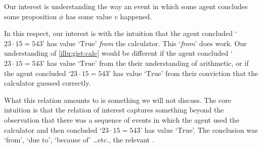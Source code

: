 \begin{note}
  Our interest is understanding the way an event in which some agent concludes some proposition \(\phi\) has some value \(v\) happened.

  In this respect, our interest is with the intuition that the agent concluded `\(23 \cdot 15 = 543\)' has value `\(\text{True}\)' \emph{from} the calculator.
  This `\emph{from}' does work.
  Our understanding of \autoref{illu:gist:calc} would be different if the agent concluded `\(23 \cdot 15 = 543\)' has value `\(\text{True}\)' from the their understanding of arithmetic, or if the agent concluded `\(23 \cdot 15 = 543\)' has value `\(\text{True}\)' from their conviction that the calculator guessed correctly.

  What this relation amounts to is something we will not discuss.
  The core intuition is that the relation of interest captures something beyond the observation that there was a sequence of events in which the agent used the calculator and then concluded `\(23 \cdot 15 = 543\)' has value `\(\text{True}\)'.
  The conclusion was `from', `due to', `because of' \dots etc., the relevant \pool{}.

\end{note}

